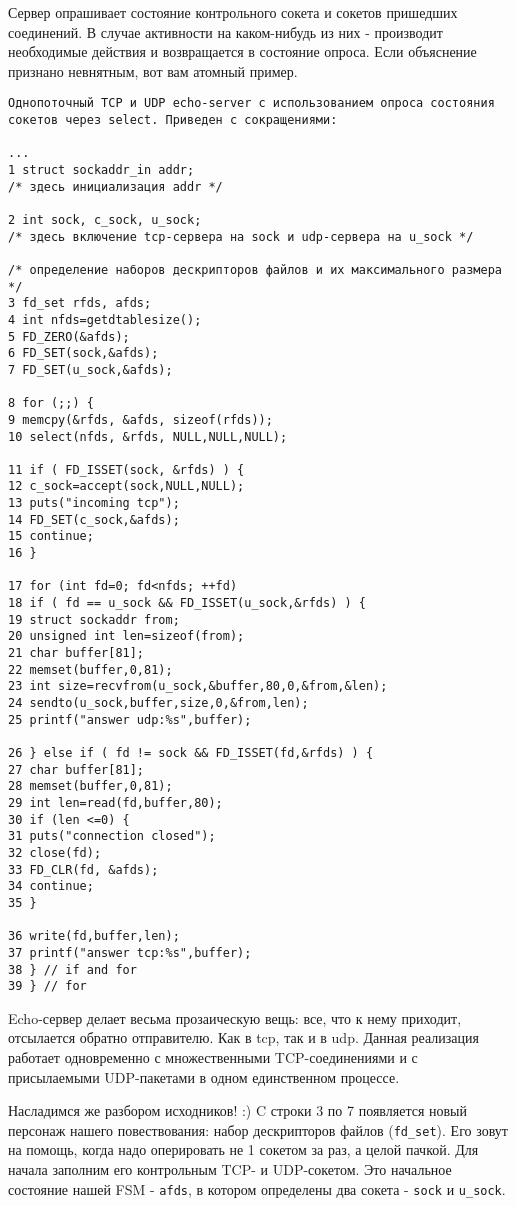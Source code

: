 Сервер опрашивает состояние контрольного сокета и сокетов пришедших соединений. В случае активности на каком-нибудь из них - производит необходимые действия и возвращается в состояние опроса. Если объяснение признано невнятным, вот вам атомный пример.
\begin{verbatim}
Однопоточный TCP и UDP echo-server с использованием опроса состояния сокетов через select. Приведен с сокращениями:

...
1 struct sockaddr_in addr;
/* здесь инициализация addr */

2 int sock, c_sock, u_sock;
/* здесь включение tcp-сервера на sock и udp-сервера на u_sock */

/* определение наборов дескрипторов файлов и их максимального размера */
3 fd_set rfds, afds;
4 int nfds=getdtablesize();
5 FD_ZERO(&afds);
6 FD_SET(sock,&afds);
7 FD_SET(u_sock,&afds);

8 for (;;) {
9 memcpy(&rfds, &afds, sizeof(rfds));
10 select(nfds, &rfds, NULL,NULL,NULL);

11 if ( FD_ISSET(sock, &rfds) ) {
12 c_sock=accept(sock,NULL,NULL);
13 puts("incoming tcp");
14 FD_SET(c_sock,&afds);
15 continue;
16 }

17 for (int fd=0; fd<nfds; ++fd)
18 if ( fd == u_sock && FD_ISSET(u_sock,&rfds) ) {
19 struct sockaddr from;
20 unsigned int len=sizeof(from);
21 char buffer[81];
22 memset(buffer,0,81);
23 int size=recvfrom(u_sock,&buffer,80,0,&from,&len);
24 sendto(u_sock,buffer,size,0,&from,len);
25 printf("answer udp:%s",buffer);

26 } else if ( fd != sock && FD_ISSET(fd,&rfds) ) {
27 char buffer[81];
28 memset(buffer,0,81);
29 int len=read(fd,buffer,80);
30 if (len <=0) {
31 puts("connection closed");
32 close(fd);
33 FD_CLR(fd, &afds);
34 continue;
35 }

36 write(fd,buffer,len);
37 printf("answer tcp:%s",buffer);
38 } // if and for
39 } // for
\end{verbatim}

Echo-сервер делает весьма прозаическую вещь: все, что к нему приходит, отсылается обратно отправителю. Как в tcp, так и в udp. Данная реализация работает одновременно с множественными TCP-соединениями и с присылаемыми UDP-пакетами в одном единственном процессе.

Насладимся же разбором исходников! :) C строки 3 по 7 появляется новый персонаж нашего повествования: набор дескрипторов файлов (\verb+fd_set+). Его зовут на помощь, когда надо оперировать не 1 сокетом за раз, а целой пачкой. Для начала заполним его контрольным TCP- и UDP-сокетом. Это начальное состояние нашей FSM - \verb+afds+, в котором определены два сокета - \verb+sock+ и \verb+u_sock+.


